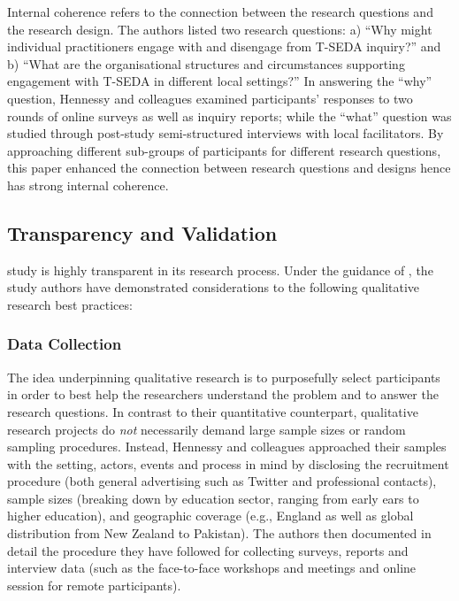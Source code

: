 \documentclass[
        a4paper, %
        12pt, %
        stu, %
        donotrepeattitle, %
        floatsintext, %
        biblatex, %
        twoside, %
        colorlinks=true,        %
        linkcolor=red,          %
        anchorcolor=red,      %
        citecolor=blue,         %
        urlcolor=blue,          %
        bookmarks=true,         %
        bookmarksopen=false,    %
        bookmarksnumbered=true,  %
        dvipsnames
]{apa7}
\begin{document}
Internal coherence refers to the connection between the research questions and the research design. The authors listed two research questions: a) ``Why might individual practitioners engage with and disengage from T-SEDA inquiry?'' and b) ``What are the organisational structures and circumstances supporting engagement with T-SEDA in different local settings?'' In answering the ``why'' question, Hennessy and colleagues examined participants' responses to two rounds of online surveys as well as inquiry reports; while the ``what'' question was studied through post-study semi-structured interviews with local facilitators. By approaching different sub-groups of participants for different research questions, this paper enhanced the connection between research questions and designs hence has strong internal coherence.

\subsection{Transparency and Validation} %

 study is highly transparent in its research process. Under the guidance of \textcite[][pp. 185--198]{creswell:2018}, the study authors have demonstrated considerations to the following qualitative research best practices:

\subsubsection{Data Collection}

The idea underpinning qualitative research is to purposefully select participants in order to best help the researchers understand the problem and to answer the research questions. In contrast to their quantitative counterpart, qualitative research projects do \emph{not} necessarily demand large sample sizes or random sampling procedures. Instead, Hennessy and colleagues approached their samples with the setting, actors, events and process in mind by disclosing the recruitment procedure (both general advertising such as Twitter and professional contacts), sample sizes (breaking down by education sector, ranging from early ears to higher education), and geographic coverage (e.g., England as well as global distribution from New Zealand to Pakistan). The authors then documented in detail the procedure they have followed for collecting surveys, reports and interview data (such as the face-to-face workshops and meetings and online session for remote participants).
\end{document}
